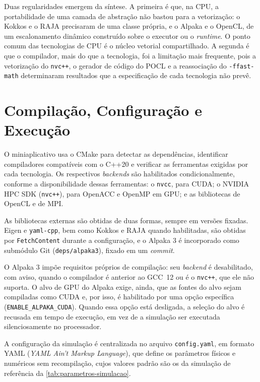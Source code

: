 Duas regularidades emergem da síntese.
A primeira é que, na CPU, a portabilidade de uma camada de abstração não bastou para a vetorização: o Kokkos e o RAJA precisaram de uma classe própria, e o Alpaka e o OpenCL, de um escalonamento dinâmico construído sobre o executor ou o \textit{runtime}.
O ponto comum das tecnologias de CPU é o núcleo vetorial compartilhado.
A segunda é que o compilador, mais do que a tecnologia, foi a limitação mais frequente, pois a vetorização do \texttt{nvc++}, o gerador de código do POCL e a reassociação do \texttt{-ffast-math} determinaram resultados que a especificação de cada tecnologia não prevê.


\section{Compilação, Configuração e Execução}\label{sec:compilacao-configuracao}

O miniaplicativo usa o CMake para detectar as dependências, identificar compiladores compatíveis com o C++20 e verificar as ferramentas exigidas por cada tecnologia.
Os respectivos \textit{backends} são habilitados condicionalmente, conforme a disponibilidade dessas ferramentas: o \texttt{nvcc}, para CUDA; o NVIDIA HPC SDK (\texttt{nvc++}), para OpenACC e OpenMP em GPU; e as bibliotecas de OpenCL e de MPI.

As bibliotecas externas são obtidas de duas formas, sempre em versões fixadas.
Eigen e \texttt{yaml-cpp}, bem como Kokkos e RAJA quando habilitadas, são obtidas por \texttt{FetchContent} durante a configuração, e o Alpaka 3 é incorporado como submódulo Git (\texttt{deps/alpaka3}), fixado em um \textit{commit}.

O Alpaka 3 impõe requisitos próprios de compilação: seu \textit{backend} é desabilitado, com aviso, quando o compilador é anterior ao GCC~12 ou é o \texttt{nvc++}, que ele não suporta.
O alvo de GPU do Alpaka exige, ainda, que as fontes do alvo sejam compiladas como CUDA e, por isso, é habilitado por uma opção específica (\texttt{ENABLE\_ALPAKA\_CUDA}).
Quando essa opção está desligada, a seleção do alvo é recusada em tempo de execução, em vez de a simulação ser executada silenciosamente no processador.

A configuração da simulação é centralizada no arquivo \texttt{config.yaml}, em formato YAML (\textit{YAML Ain't Markup Language}), que define os parâmetros físicos e numéricos sem recompilação, cujos valores padrão são os da simulação de referência da \autoref{tab:parametros-simulacao}.
